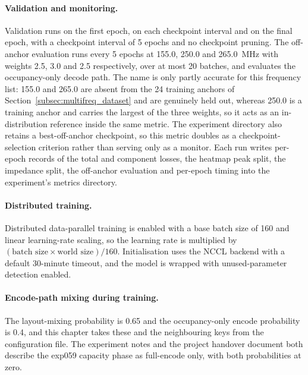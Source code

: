 \paragraph{Validation and monitoring.} Validation runs on the first epoch, on each checkpoint
interval and on the final epoch, with a checkpoint interval of 5 epochs and no checkpoint pruning.
The off-anchor evaluation runs every 5 epochs at 155.0, 250.0 and 265.0~MHz with weights 2.5, 3.0 and
2.5 respectively, over at most 20 batches, and evaluates the occupancy-only decode path. The name is
only partly accurate for this frequency list: 155.0 and 265.0 are absent from the 24 training anchors
of Section~\ref{subsec:multifreq_dataset} and are genuinely held out, whereas 250.0 is a training
anchor and carries the largest of the three weights, so it acts as an in-distribution reference
inside the same metric. The experiment directory also retains a best-off-anchor checkpoint, so this
metric doubles as a checkpoint-selection criterion rather than serving only as a monitor.
Each run writes per-epoch records of the total and component losses, the heatmap peak split, the
impedance split, the off-anchor evaluation and per-epoch timing into the experiment's metrics
directory.

\paragraph{Distributed training.} Distributed data-parallel training is enabled with a base batch
size of 160 and linear learning-rate scaling, so the learning rate is multiplied by
$(\text{batch size} \times \text{world size}) / 160$. Initialisation uses the NCCL backend with a
default 30-minute timeout, and the model is wrapped with unused-parameter detection enabled.

\paragraph{Encode-path mixing during training.} The layout-mixing probability is 0.65 and the
occupancy-only encode probability is 0.4, and this chapter takes these and the neighbouring keys from
the configuration file. The experiment notes and the project handover document both describe the
exp059 capacity phase as full-encode only, with both probabilities at zero.

